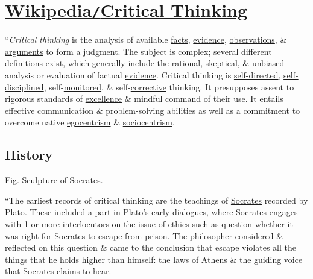 \documentclass[oneside]{book}
\numberwithin{equation}{section}
\begin{document}
\section{\href{https://en.wikipedia.org/wiki/Critical_thinking}{Wikipedia\texttt{/}Critical Thinking}}
``\textit{Critical thinking} is the analysis of available \href{https://en.wikipedia.org/wiki/Fact}{facts}, \href{https://en.wikipedia.org/wiki/Evidence}{evidence}, \href{https://en.wikipedia.org/wiki/Observation}{observations}, \& \href{https://en.wikipedia.org/wiki/Argument}{arguments} to form a judgment. The subject is complex; several different \href{https://en.wikipedia.org/wiki/Critical_thinking#Definitions}{definitions} exist, which generally include the \href{https://en.wikipedia.org/wiki/Rational}{rational}, \href{https://en.wikipedia.org/wiki/Skepticism}{skeptical}, \& \href{https://en.wikipedia.org/wiki/Unbiased}{unbiased} analysis or evaluation of factual \href{https://en.wikipedia.org/wiki/Evidence}{evidence}. Critical thinking is \href{https://en.wikipedia.org/wiki/Self-directedness}{self-directed}, \href{https://en.wikipedia.org/wiki/Discipline}{self-disciplined}, self-\href{https://en.wikipedia.org/wiki/Monitoring_(medicine)}{monitored}, \& self-\href{https://en.wikipedia.org/wiki/Corrective_feedback}{corrective} thinking. It presupposes assent to rigorous standards of \href{https://en.wikipedia.org/wiki/Excellence}{excellence} \& mindful command of their use. It entails effective communication \& problem-solving abilities as well as a commitment to overcome native \href{https://en.wikipedia.org/wiki/Egocentrism}{egocentrism} \& \href{https://en.wikipedia.org/wiki/Sociocentrism}{sociocentrism}.

\subsection{History}
\textsf{Fig. Sculpture of Socrates.}

``The earliest records of critical thinking are the teachings of \href{https://en.wikipedia.org/wiki/Socrates}{Socrates} recorded by \href{https://en.wikipedia.org/wiki/Plato}{Plato}. These included a part in Plato's early dialogues, where Socrates engages with 1 or more interlocutors on the issue of ethics such as question whether it was right for Socrates to escape from prison. The philosopher considered \& reflected on  this question \& came to the conclusion that escape violates all the things that he holds higher than himself: the laws of Athens \& the guiding voice that Socrates claims to hear.
\end{document}
